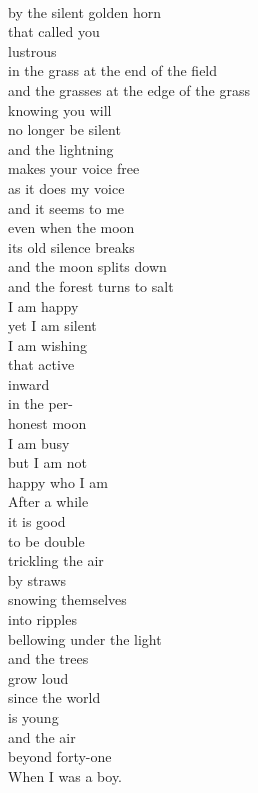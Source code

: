 \documentclass[smalldemyvopaper,11pt,twoside,onecolumn,openright,extrafontsizes]{memoir}
\begin{document}
\\by the silent golden horn
\\that called you
\\lustrous
\\in the grass at the end of the field
\\and the grasses at the edge of the grass
\\knowing you will
\\no longer be silent
\\and the lightning
\\makes your voice free
\\as it does my voice
\\and it seems to me
\\even when the moon
\\its old silence breaks
\\and the moon splits down
\\and the forest turns to salt
\\I am happy
\\yet I am silent
\\I am wishing
\\that active
\\inward
\\in the per-
\\honest moon
\\I am busy
\\but I am not
\\happy who I am
\\After a while
\\it is good
\\to be double
\\trickling the air
\\by straws
\\snowing themselves
\\into ripples
\\bellowing under the light
\\and the trees
\\grow loud
\\since the world
\\is young
\\and the air
\\beyond forty-one
\\When I was a boy.
\end{document}
